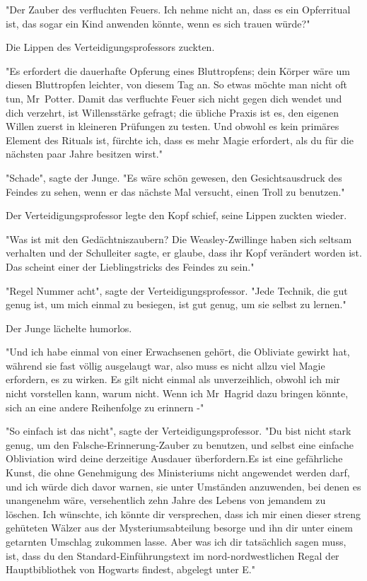 {"Der Zauber des verfluchten Feuers. Ich nehme nicht an, dass es ein Opferritual ist, das sogar ein Kind anwenden könnte, wenn es sich trauen würde?"

Die Lippen des Verteidigungsprofessors zuckten.

"Es erfordert die dauerhafte Opferung eines Bluttropfens; dein Körper wäre um diesen Bluttropfen leichter, von diesem Tag an. So etwas möchte man nicht oft tun, Mr~Potter. Damit das verfluchte Feuer sich nicht gegen dich wendet und dich verzehrt, ist Willensstärke gefragt; die übliche Praxis ist es, den eigenen Willen zuerst in kleineren Prüfungen zu testen. Und obwohl es kein primäres Element des Rituals ist, fürchte ich, dass es mehr Magie erfordert, als du für die nächsten paar Jahre besitzen wirst."

"Schade", sagte der Junge. "Es wäre schön gewesen, den Gesichtsausdruck des Feindes zu sehen, wenn er das nächste Mal versucht, einen Troll zu benutzen."

Der Verteidigungsprofessor legte den Kopf schief, seine Lippen zuckten wieder.

"Was ist mit den Gedächtniszaubern? Die Weasley-Zwillinge haben sich seltsam verhalten und der Schulleiter sagte, er glaube, dass ihr Kopf verändert worden ist. Das scheint einer der Lieblingstricks des Feindes zu sein."

"Regel Nummer acht", sagte der Verteidigungsprofessor. "Jede Technik, die gut genug ist, um mich einmal zu besiegen, ist gut genug, um sie selbst zu lernen."

Der Junge lächelte humorlos.

"Und ich habe einmal von einer Erwachsenen gehört, die Obliviate gewirkt hat, während sie fast völlig ausgelaugt war, also muss es nicht allzu viel Magie erfordern, es zu wirken. Es gilt nicht einmal als unverzeihlich, obwohl ich mir nicht vorstellen kann, warum nicht. Wenn ich Mr~Hagrid dazu bringen könnte, sich an eine andere Reihenfolge zu erinnern -"

"So einfach ist das nicht", sagte der Verteidigungsprofessor. "Du bist nicht stark genug, um den Falsche-Erinnerung-Zauber zu benutzen, und selbst eine einfache Obliviation wird deine derzeitige Ausdauer überfordern.Es ist eine gefährliche Kunst, die ohne Genehmigung des Ministeriums nicht angewendet werden darf, und ich würde dich davor warnen, sie unter Umständen anzuwenden, bei denen es unangenehm wäre, versehentlich zehn Jahre des Lebens von jemandem zu löschen. Ich wünschte, ich könnte dir versprechen, dass ich mir einen dieser streng gehüteten Wälzer aus der Mysteriumsabteilung besorge und ihn dir unter einem getarnten Umschlag zukommen lasse. Aber was ich dir tatsächlich sagen muss, ist, dass du den Standard-Einführungstext im nord-nordwestlichen Regal der Hauptbibliothek von Hogwarts findest, abgelegt unter E."

}
